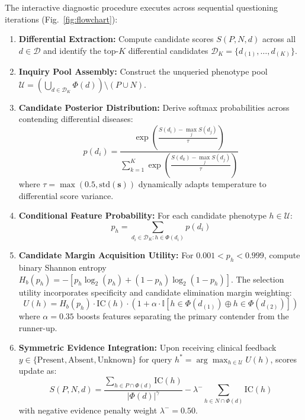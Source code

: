 \documentclass[conference]{IEEEtran}
\begin{document}
The interactive diagnostic procedure executes across sequential questioning iterations (Fig.~\ref{fig:flowchart}):
\begin{enumerate}
    \item \textbf{Differential Extraction:} Compute candidate scores $S(P, N, d)$ across all $d \in \mathcal{D}$ and identify the top-$K$ differential candidates $\mathcal{D}_K = \{d_{(1)}, \dots, d_{(K)}\}$.
    \item \textbf{Inquiry Pool Assembly:} Construct the unqueried phenotype pool $\mathcal{U} = \left(\bigcup_{d \in \mathcal{D}_K} \Phi(d)\right) \setminus (P \cup N)$.
    \item \textbf{Candidate Posterior Distribution:} Derive softmax probabilities across contending differential diseases:
    \begin{equation}
    p(d_i) = \frac{\exp\left(\frac{S(d_i) - \max_j S(d_j)}{\tau}\right)}{\sum_{k=1}^K \exp\left(\frac{S(d_k) - \max_j S(d_j)}{\tau}\right)}
    \end{equation}
    where $\tau = \max(0.5, \text{std}(\mathbf{s}))$ dynamically adapts temperature to differential score variance.
    \item \textbf{Conditional Feature Probability:} For each candidate phenotype $h \in \mathcal{U}$:
    \begin{equation}
    p_h = \sum_{d_i \in \mathcal{D}_K : h \in \Phi(d_i)} p(d_i)
    \end{equation}
    \item \textbf{Candidate Margin Acquisition Utility:} For $0.001 < p_h < 0.999$, compute binary Shannon entropy $H_b(p_h) = - [p_h \log_2(p_h) + (1 - p_h) \log_2(1 - p_h)]$. The selection utility incorporates specificity and candidate elimination margin weighting:
    \begin{equation}
    U(h) = H_b(p_h) \cdot \text{IC}(h) \cdot \left(1 + \alpha \cdot \mathbb{I}\left[h \in \Phi(d_{(1)}) \oplus h \in \Phi(d_{(2)})\right]\right)
    \label{eq:utility}
    \end{equation}
    where $\alpha = 0.35$ boosts features separating the primary contender from the runner-up.
    \item \textbf{Symmetric Evidence Integration:} Upon receiving clinical feedback $y \in \{\text{Present}, \text{Absent}, \text{Unknown}\}$ for query $h^* = \arg\max_{h \in \mathcal{U}} U(h)$, scores update as:
    \begin{equation}
    S(P, N, d) = \frac{\sum_{h \in P \cap \Phi(d)} \text{IC}(h)}{|\Phi(d)|^\gamma} - \lambda^- \sum_{h \in N \cap \Phi(d)} \text{IC}(h)
    \label{eq:penalty}
    \end{equation}
    with negative evidence penalty weight $\lambda^- = 0.50$.
\end{enumerate}
\end{document}
